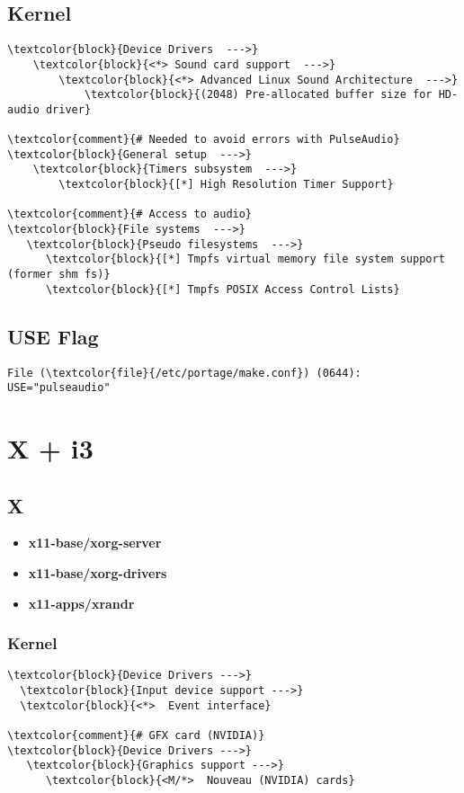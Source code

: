 \documentclass[10pt, a4paper, onecolumn, openany]{book}         %
\begin{document}
\section{Kernel}
\begin{Verbatim}[commandchars=\\\{\}]
\textcolor{block}{Device Drivers  --->}
    \textcolor{block}{<*> Sound card support  --->}
        \textcolor{block}{<*> Advanced Linux Sound Architecture  --->}
            \textcolor{block}{(2048) Pre-allocated buffer size for HD-audio driver}

\textcolor{comment}{# Needed to avoid errors with PulseAudio}
\textcolor{block}{General setup  --->}
    \textcolor{block}{Timers subsystem  --->}
        \textcolor{block}{[*] High Resolution Timer Support}

\textcolor{comment}{# Access to audio}        
\textcolor{block}{File systems  --->}
   \textcolor{block}{Pseudo filesystems  --->}
      \textcolor{block}{[*] Tmpfs virtual memory file system support (former shm fs)}
      \textcolor{block}{[*] Tmpfs POSIX Access Control Lists}
\end{Verbatim}

\section{USE Flag}
\begin{Verbatim}[commandchars=\\\{\}]
File (\textcolor{file}{/etc/portage/make.conf}) (0644):
USE="pulseaudio"

\end{Verbatim}


\chapter{X + i3}
\section{X}
\begin{itemize}
    \item \textbf{x11-base/xorg-server}
    \item \textbf{x11-base/xorg-drivers}
    \item \textbf{x11-apps/xrandr}
\end{itemize}

\subsection{Kernel}
\begin{Verbatim}[commandchars=\\\{\}]
\textcolor{block}{Device Drivers --->}
  \textcolor{block}{Input device support --->}
  \textcolor{block}{<*>  Event interface}
  
\textcolor{comment}{# GFX card (NVIDIA)}
\textcolor{block}{Device Drivers --->}
   \textcolor{block}{Graphics support --->}
      \textcolor{block}{<M/*>  Nouveau (NVIDIA) cards}
\end{Verbatim}
\end{document}
